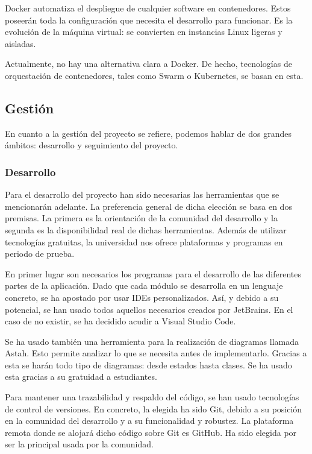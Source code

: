 Docker automatiza el despliegue de cualquier software en contenedores. Estos poseerán toda la configuración que necesita el desarrollo para funcionar. Es la evolución de la máquina virtual: se convierten en instancias Linux ligeras y aisladas.

Actualmente, no hay una alternativa clara a Docker. De hecho, tecnologías de orquestación de contenedores, tales como Swarm o Kubernetes, se basan en esta.

\subsection{Gestión}

En cuanto a la gestión del proyecto se refiere, podemos hablar de dos grandes ámbitos: desarrollo y seguimiento del proyecto.

\subsubsection{Desarrollo}

Para el desarrollo del proyecto han sido necesarias las herramientas que se mencionarán adelante. La preferencia general de dicha elección se basa en dos premisas. La primera es la orientación de la comunidad del desarrollo y la segunda es la disponibilidad real de dichas herramientas. Además de utilizar tecnologías gratuitas, la universidad nos ofrece plataformas y programas en periodo de prueba.

En primer lugar son necesarios los programas para el desarrollo de las diferentes partes de la aplicación. Dado que cada módulo se desarrolla en un lenguaje concreto, se ha apostado por usar IDEs personalizados. Así, y debido a su potencial, se han usado todos aquellos necesarios creados por JetBrains. En el caso de no existir, se ha decidido acudir a Visual Studio Code.

Se ha usado también una herramienta para la realización de diagramas llamada Astah. Esto permite analizar lo que se necesita antes de implementarlo. Gracias a esta se harán todo tipo de diagramas: desde estados hasta clases. Se ha usado esta gracias a su gratuidad a estudiantes.

Para mantener una trazabilidad y respaldo del código, se han usado tecnologías de control de versiones. En concreto, la elegida ha sido Git, debido a su posición en la comunidad del desarrollo y a su funcionalidad y robustez. La plataforma remota donde se alojará dicho código sobre Git es GitHub. Ha sido elegida por ser la principal usada por la comunidad.


